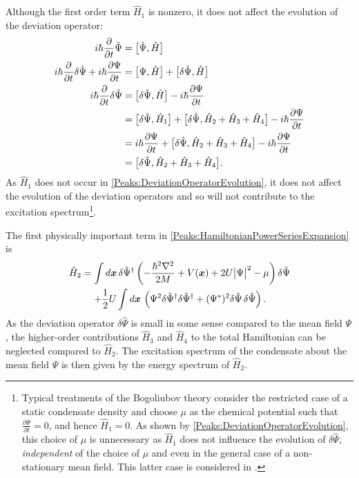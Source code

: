 Although the first order term $\hat{H}_1$ is nonzero, it does not affect the evolution of the deviation operator:
\begin{align}
    i \hbar \frac{\partial }{\partial t}\hat{\Psi} &= \comm{\hat{\Psi}, \hat{H}}\\
    i \hbar \frac{\partial }{\partial t}\delta{\hat{\Psi}} + i \hbar \frac{\partial \Psi}{\partial t} &= \comm{\Psi, \hat{H}} + \comm{\delta\hat{\Psi}, \hat{H}}\\
    i \hbar \frac{\partial }{\partial t}\delta \hat{\Psi} &= \comm{\delta \hat{\Psi}, \hat{H}} - i \hbar \frac{\partial  \Psi}{\partial t}\\
    &= \comm{\delta \hat{\Psi}, \hat{H}_1} + \comm{\delta \hat{\Psi}, \hat{H}_2 + \hat{H}_3 + \hat{H}_4} - i \hbar \frac{\partial\Psi }{\partial t}\\
    &= i \hbar \frac{\partial \Psi}{\partial t} + \comm{\delta \hat{\Psi}, \hat{H}_2 + \hat{H}_3 + \hat{H}_4} - i \hbar \frac{\partial \Psi}{\partial t}\\
    &= \comm{\delta \hat{\Psi}, \hat{H}_2 + \hat{H}_3 + \hat{H}_4}. \label{Peaks:DeviationOperatorEvolution}
\end{align}
As $\hat{H}_1$ does not occur in \eqref{Peaks:DeviationOperatorEvolution}, it does not affect the evolution of the deviation operators and so will not contribute to the excitation spectrum\footnote{Typical treatments of the Bogoliubov theory consider the restricted case of a static condensate density and choose $\mu$ as the chemical potential such that $\displaystyle \frac{\partial \Psi}{\partial t} = 0$, and hence $\hat{H}_1=0$. As shown by \eqref{Peaks:DeviationOperatorEvolution}, this choice of $\mu$ is unnecessary as $\hat{H}_1$ does not influence the evolution of $\delta\hat{\Psi}$, \emph{independent} of the choice of $\mu$ and even in the general case of a non-stationary mean field. This latter case is considered in .}.

The first physically important term in \eqref{Peaks:HamiltonianPowerSeriesExpansion} is
\begin{align}
    \begin{split}
        \hat{H}_2 &= \int d \vect{x}\, \delta \hat{\Psi}^\dagger \left(-\frac{\hbar^2 \nabla^2}{2 M} + V(\vect{x}) + 2 U\big|\Psi\big|^2 -\mu \right)\delta\hat{\Psi}\\
         &\relphantom{=} + \frac{1}{2} U\int d \vect{x}\, \left(\Psi^2 \delta \hat{\Psi}^\dagger\delta \hat{\Psi}^\dagger  +  (\Psi^*)^2 \delta \hat{\Psi} \,\delta \hat{\Psi}\right).
    \end{split}
    \label{Peaks:HamiltonianPowerSeriesQuadraticTerm}
\end{align}
As the deviation operator $\delta \hat{\Psi}$ is small in some sense compared to the mean field $\Psi$, the higher-order contributions $\hat{H}_3$ and $\hat{H}_4$ to the total Hamiltonian can be neglected compared to $\hat{H}_2$. The excitation spectrum of the condensate about the mean field $\Psi$ is then given by the energy spectrum of $\hat{H}_2$.


